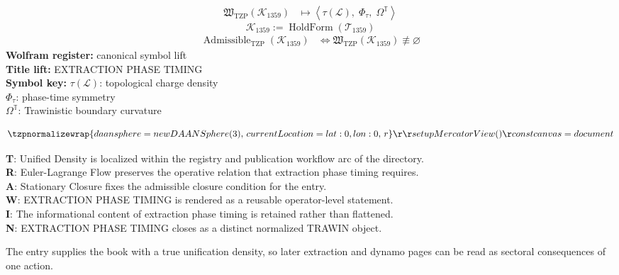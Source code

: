 \noindent
\begin{minipage}[t]{0.48\linewidth}
\begingroup
\small
\[
\begin{aligned}
\mathfrak{W}_{\mathrm{TZP}}\!\left(\mathcal{K}_{1359}\right)
&\longmapsto
\left\langle \tau(\mathcal{L}),\; \Phi_{\tau},\; \Omega^{\mathbb{T}} \right\rangle
\end{aligned}
\]
\[
\mathcal{K}_{1359}
:=
\operatorname{HoldForm}\!\left(\mathcal{T}_{1359}\right)
\]
\[
\begin{aligned}
\operatorname{Admissible}_{\mathrm{TZP}}\!\left(\mathcal{K}_{1359}\right)
&\Longleftrightarrow
\mathfrak{W}_{\mathrm{TZP}}\!\left(\mathcal{K}_{1359}\right)\not\equiv\varnothing
\end{aligned}
\]
\textbf{Wolfram register:} canonical symbol lift\\
\textbf{Title lift:} EXTRACTION PHASE TIMING\\
\textbf{Symbol key:} \(\tau(\mathcal{L})\): topological charge density\\ \(\Phi_{\tau}\): phase-time symmetry\\ \(\Omega^{\mathbb{T}}\): Trawinistic boundary curvature
\par
\endgroup
\end{minipage}\hfill
\begin{minipage}[t]{0.48\linewidth}
\[
\tzpnormalizewrap{daansphere = new DAANSphere(3),\,currentLocation = { lat: 0, lon: 0 },\,r  }\r  \r  setupMercatorView() {\r  const canvas = document}
\]

\small
\textbf{T}: Unified Density is localized within the registry and publication workflow arc of the directory.\\
\textbf{R}: Euler-Lagrange Flow preserves the operative relation that extraction phase timing requires.\\
\textbf{A}: Stationary Closure fixes the admissible closure condition for the entry.\\
\textbf{W}: EXTRACTION PHASE TIMING is rendered as a reusable operator-level statement.\\
\textbf{I}: The informational content of extraction phase timing is retained rather than flattened.\\
\textbf{N}: EXTRACTION PHASE TIMING closes as a distinct normalized TRAWIN object.
\normalsize
\end{minipage}

The entry supplies the book with a true unification density, so later extraction and dynamo pages can be read as sectoral consequences of one action.
\clearpage

